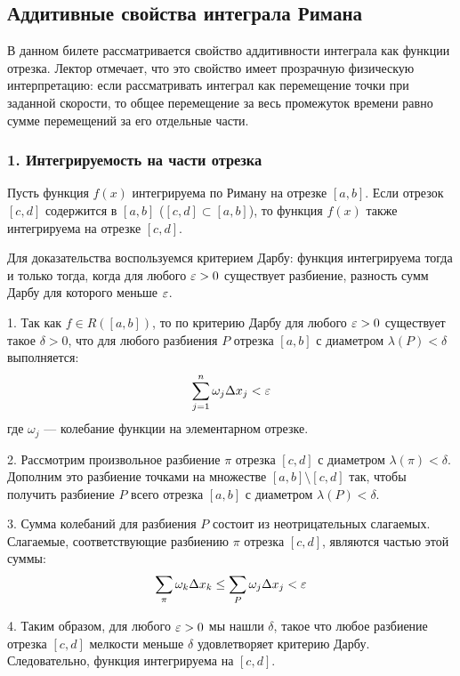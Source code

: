 \subsection{Аддитивные свойства интеграла Римана}

В данном билете рассматривается свойство аддитивности интеграла как функции отрезка. Лектор отмечает, что это свойство имеет прозрачную физическую интерпретацию: если рассматривать интеграл как перемещение точки при заданной скорости, то общее перемещение за весь промежуток времени равно сумме перемещений за его отдельные части.

\subsubsection*{1. Интегрируемость на части отрезка}

\begin{theorem}
Пусть функция $f(x)$ интегрируема по Риману на отрезке $[a, b]$. Если отрезок $[c, d]$ содержится в $[a, b]$ ($[c, d] \subset [a, b]$), то функция $f(x)$ также интегрируема на отрезке $[c, d]$.
\end{theorem}

\begin{tcolorbox}[title=Доказательство, breakable]
Для доказательства воспользуемся критерием Дарбу: функция интегрируема тогда и только тогда, когда для любого $\varepsilon > 0$ существует разбиение, разность сумм Дарбу для которого меньше $\varepsilon$.

1. Так как $f \in R([a, b])$, то по критерию Дарбу для любого $\varepsilon > 0$ существует такое $\delta > 0$, что для любого разбиения $P$ отрезка $[a, b]$ с диаметром $\lambda(P) < \delta$ выполняется:
\[ \sum_{j=1}^n \omega_j \Delta x_j < \varepsilon \]
где $\omega_j$ — колебание функции на элементарном отрезке.

2. Рассмотрим произвольное разбиение $\pi$ отрезка $[c, d]$ с диаметром $\lambda(\pi) < \delta$. Дополним это разбиение точками на множестве $[a, b] \setminus [c, d]$ так, чтобы получить разбиение $P$ всего отрезка $[a, b]$ с диаметром $\lambda(P) < \delta$.

3. Сумма колебаний для разбиения $P$ состоит из неотрицательных слагаемых. Слагаемые, соответствующие разбиению $\pi$ отрезка $[c, d]$, являются частью этой суммы:
\[ \sum_{\pi} \omega_k \Delta x_k \le \sum_{P} \omega_j \Delta x_j < \varepsilon \]

4. Таким образом, для любого $\varepsilon > 0$ мы нашли $\delta$, такое что любое разбиение отрезка $[c, d]$ мелкости меньше $\delta$ удовлетворяет критерию Дарбу. Следовательно, функция интегрируема на $[c, d]$.
\end{tcolorbox}

